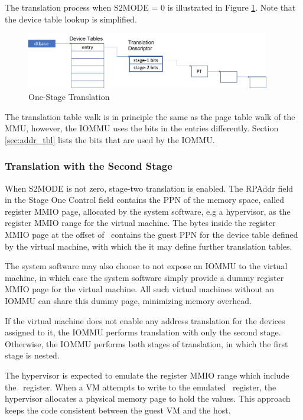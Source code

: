 The translation process when S2MODE = 0 is illustrated in Figure \ref{fig:one-stage-trans}.
Note that the device table lookup is simplified.

\begin{figure}[ht!]
    \centering
    \includegraphics[width=0.95\textwidth]{img/one-stage-trans.pdf}
    \caption{One-Stage Translation}
    \label{fig:one-stage-trans}
\end{figure}

The translation table walk is in principle the same as the page table walk of the MMU,
however, the IOMMU uses the bits in the entries differently. Section \ref{sec:addr_tbl}
lists the bits that are used by the IOMMU.

\subsubsection{Translation with the Second Stage}

When S2MODE is not zero, stage-two translation is enabled. The RPAddr field in the Stage
One Control field contains the PPN of the memory space, called register MMIO page,
allocated by the system software, e.g a hypervisor, as the register MMIO range for the
virtual machine. The bytes inside the register MMIO page at the offset of \dtbase\
contains the guest PPN for the device table defined by the virtual machine, with which the
it may define further translation tables.

\note The system software may also choose to not expose an IOMMU to the virtual machine,
in which case the system software simply provide a dummy register MMIO page for the
virtual machine. All such virtual machines without an IOMMU can share this dummy page,
minimizing memory overhead. \noteend

If the virtual machine does not enable any address translation for the devices assigned to
it, the IOMMU performs translation with only the second stage. Otherwise, the IOMMU
performs both stages of translation, in which the first stage is nested.

The hypervisor is expected to emulate the register MMIO range which include the
\dtbase\ register. When a VM attempts to write to the emulated \dtbase\
register, the hypervisor allocates a physical memory page to hold the values. This
approach keeps the code consistent between the guest VM and the host. 

